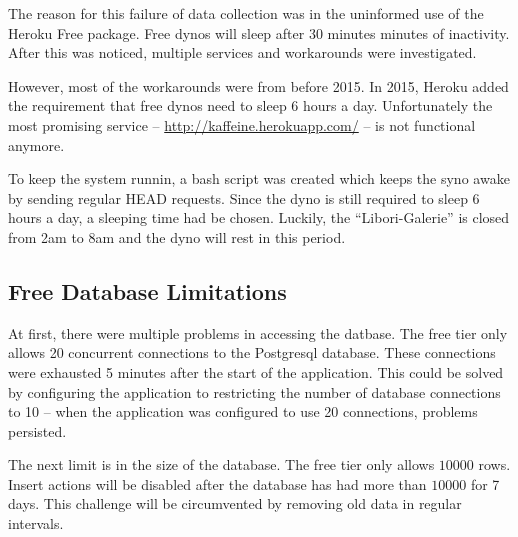 The reason for this failure of data collection was in the uninformed use of the Heroku Free package. Free dynos will sleep after 30 minutes minutes of inactivity. After this was noticed, multiple services and workarounds were investigated.

However, most of the workarounds were from before 2015. In 2015, Heroku added the requirement that free dynos need to sleep 6 hours a day. Unfortunately the most promising service -- \url{http://kaffeine.herokuapp.com/} -- is not functional anymore.

To keep the system runnin, a bash script was created which keeps the syno awake by sending regular HEAD requests. Since the dyno is still required to sleep 6 hours a day, a sleeping time had be chosen. Luckily, the ``Libori-Galerie'' is closed from 2am to 8am and the dyno will rest in this period. 

\subsection{Free Database Limitations}
At first, there were multiple problems in accessing the datbase. The free tier only allows 20 concurrent connections to the Postgresql database. These connections were exhausted 5 minutes after the start of the application. This could be solved by configuring the application to restricting the number of database connections to 10 -- when the application was configured to use 20 connections, problems persisted.

The next limit is in the size of the database. The free tier only allows \(10000\) rows. Insert actions will be disabled after the database has had more than \(10000\) for 7 days. This challenge will be circumvented by removing old data in regular intervals.


  



